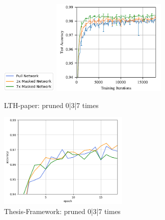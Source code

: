 \begin{figure}
	\begin{minipage}{\textwidth}
		\centering
		\includegraphics[width=100px]{gfx/7-Evaluation/LTH_1_legend.png}
	\end{minipage}
	\begin{minipage}{0.5\textwidth}
		\centering
		\includegraphics[height=175px]{gfx/7-Evaluation/LTH_1.png}
		\caption*{LTH-paper: pruned 0|3|7 times}
		\label{?}
	\end{minipage}\hfill
	\begin{minipage}{0.5\textwidth}
		\centering
		\includegraphics[height=175px]{gfx/Experiments/Reproduction-MNIST-FCN/accuracy/LTH_1.png}
		\caption*{Thesis-Framework: pruned 0|3|7 times}
		\label{?}
	\end{minipage}
\end{figure}

